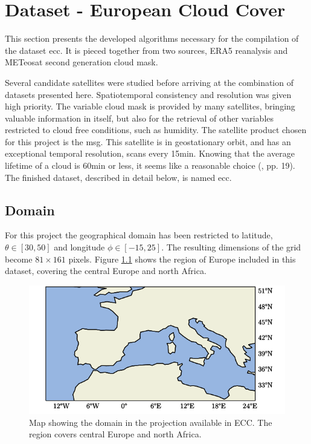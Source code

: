 \chapter{Dataset - European Cloud Cover }
This section presents the developed algorithms necessary for the compilation of the dataset \acrfull{ecc}. It is pieced together from two sources, ERA5 reanalysis and METeosat second generation cloud mask.

Several candidate satellites were studied before arriving at the combination of datasets presented here. Spatiotemporal consistency and resolution was given high priority. 
The variable cloud mask is provided by many satellites, bringing valuable information in itself, but also for the retrieval of other variables restricted to cloud free conditions, such as humidity. The satellite product chosen for this project is the \acrfull{msg}. This satellite is in geostationary orbit, and has an exceptional temporal resolution, scans every 15min. Knowing that the average lifetime of a cloud is 60min or less, it seems like a reasonable choice (\cite{lohmann2016}, pp. 19). The finished dataset, described in detail below, is named \acrfull{ecc}.

\section{Domain}
For this project the geographical domain has been restricted to latitude, $\theta \in[30,50]$ and longitude $\phi \in [-15, 25]$. The resulting dimensions of the grid become $81\times161$ pixels. Figure \ref{fig:map} shows the region of Europe included in this dataset, covering the central Europe and north Africa.
\begin{figure}[h]
    \centering
    \includegraphics[scale = 1.0]{python_figs/Domain.png}
    \caption[Map over domain.]{Map showing the domain in the projection available in ECC. The region covers central Europe and north Africa.}
    \label{fig:map}
\end{figure}

